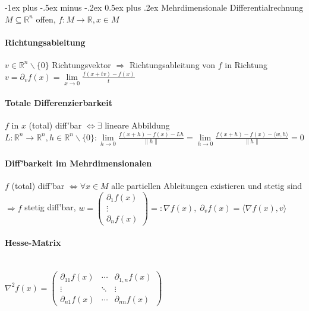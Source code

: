 \documentclass[paper=a3,paper=landscape, fontsize=9pt,DIV=30]{scrartcl}
\makeatletter
\newcommand{\real}{{\mathbb{R}}}
\renewcommand{\section}{\@startsection{section}{1}{0mm}%
  {-1ex plus -.5ex minus -.2ex}%
  {0.5ex plus .2ex}%
  {\color{blue}\normalfont\large\bfseries}}
\makeatother
\begin{document}
\begin{multicols*}{4}
  \section{Mehrdimensionale Differentialrechnung}
	$M \subseteq \real^n$ offen, $f: M \rightarrow \real, x \in M$
	\paragraph{Richtungsableitung}
	$ v \in \real^n \backslash \{0\}$ Richtungsvektor $\Rightarrow$ Richtungsableitung von $f$ in Richtung $v = \partial_vf(x)= \lim\limits_{x \rightarrow 0} \frac{f(x+tv)-f(x)}{t}$

  \paragraph{Totale Differenzierbarkeit}
$f$ in $x$ (total) diff'bar $\Leftrightarrow \exists$ lineare Abbildung $L: \real^n \rightarrow \real^n, h \in \real^n \backslash \{0\}: \lim\limits_{h \rightarrow 0} \frac{f(x+h)-f(x)-Lh}{\lVert h \rVert} = \lim\limits_{h \rightarrow 0} \frac{f(x+h)-f(x)-\langle w,h \rangle}{\lVert h \rVert} = 0$

 \paragraph{Diff'barkeit im Mehrdimensionalen}
 $f$ (total) diff'bar $\Leftrightarrow \forall x \in M$ alle partiellen Ableitungen existieren und stetig sind $\Rightarrow f$ stetig diff'bar, $w=\begin{pmatrix}
 \partial_1f(x)\\\vdots \\ \partial_nf(x)
 \end{pmatrix} =: \nabla f(x),\; \partial_vf(x)=\langle \nabla f(x), v \rangle$

 \paragraph{Hesse-Matrix}\hspace{0pt}\\
  $ \nabla^2f(x) = \begin{pmatrix}
  \partial_{11}f(x)  & \cdots & \partial_{1,n}f(x) \\
  \vdots  & \ddots & \vdots  \\
  \partial_{n1}f(x) & \cdots & \partial_{nn}f(x)
 \end{pmatrix}$




\end{multicols*}
\end{document}
